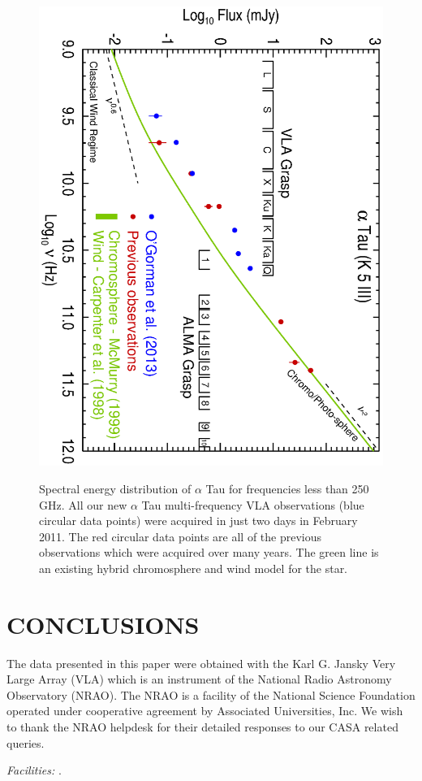 \documentclass[iop]{emulateapj}
\begin{document}
\begin{figure}
\includegraphics[trim = 0mm 0mm 0mm 20mm, clip,scale=0.65, angle=90]{fig2.ps}
\\
\caption{Spectral energy distribution of $\alpha$ Tau for frequencies less than 250 GHz. All our new $\alpha$ Tau multi-frequency VLA observations (blue circular data points) were acquired in just two days in February 2011. The red circular data points are all of the previous observations which were acquired over many years. The green line is an existing hybrid chromosphere and wind model for the star.}
\label{fig:fig2}
\end{figure}

\section{CONCLUSIONS}

\acknowledgments
The data presented in this paper were obtained with the Karl G. Jansky Very Large Array (VLA) which is an instrument of the National Radio Astronomy Observatory (NRAO). The NRAO is a facility of the National Science Foundation operated under cooperative agreement by Associated Universities, Inc. We wish to thank the NRAO helpdesk for their detailed responses to our CASA related queries.

{\it Facilities:} .


\end{document}
